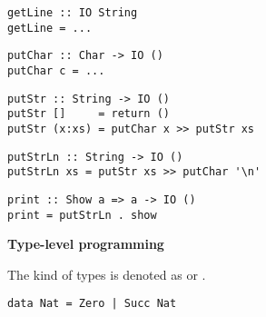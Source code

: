 \begin{multicols}{2}
\begin{verbatim}
getLine :: IO String
getLine = ...
\end{verbatim}

\begin{verbatim}
putChar :: Char -> IO ()
putChar c = ...
\end{verbatim}

\begin{verbatim}
putStr :: String -> IO ()
putStr []     = return ()
putStr (x:xs) = putChar x >> putStr xs
\end{verbatim}

\begin{verbatim}
putStrLn :: String -> IO ()
putStrLn xs = putStr xs >> putChar '\n'
\end{verbatim}

\begin{verbatim}
print :: Show a => a -> IO ()
print = putStrLn . show
\end{verbatim}
	
\textbf{\large Type-level programming}

The kind of types is denoted as \haskellIn{*} or . 
	
\begin{verbatim}
data Nat = Zero | Succ Nat
\end{verbatim}
\end{multicols}